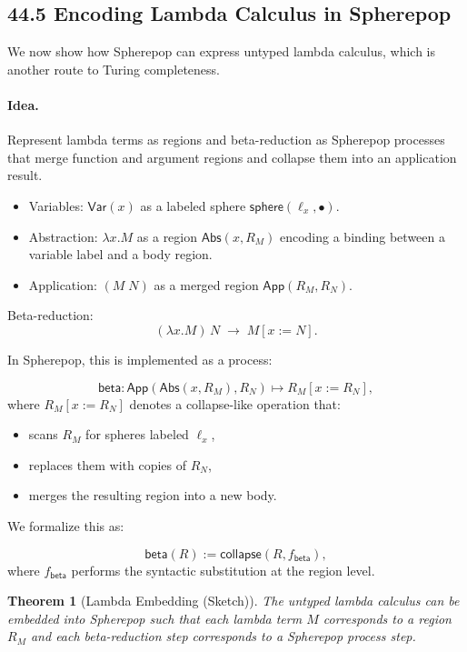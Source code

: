 \documentclass[12pt,letterpaper]{article}
\newtheorem{theorem}{Theorem}[section]
\theoremstyle{remark}
\begin{document}
\subsection{44.5 Encoding Lambda Calculus in Spherepop}

We now show how Spherepop can express untyped lambda calculus, which is another route to Turing completeness.

\paragraph{Idea.} Represent lambda terms as regions and beta-reduction as Spherepop processes that merge function and argument regions and collapse them into an application result.

\begin{itemize}
  \item Variables: $\mathsf{Var}(x)$ as a labeled sphere $\mathsf{sphere}(\ell_x, \bullet)$.
  \item Abstraction: $\lambda x. M$ as a region $\mathsf{Abs}(x, R_M)$ encoding a binding between a variable label and a body region.
  \item Application: $(M\;N)$ as a merged region $\mathsf{App}(R_M, R_N)$.
\end{itemize}

Beta-reduction:
\[
(\lambda x. M)\,N \;\to\; M[x := N].
\]

In Spherepop, this is implemented as a process:

\[
\mathsf{beta} :
\mathsf{App}(\mathsf{Abs}(x, R_M), R_N)
\mapsto
R_M[x := R_N],
\]
where $R_M[x := R_N]$ denotes a collapse-like operation that:

\begin{itemize}
  \item scans $R_M$ for spheres labeled $\ell_x$,
  \item replaces them with copies of $R_N$,
  \item merges the resulting region into a new body.
\end{itemize}

We formalize this as:

\[
\mathsf{beta}(R) := \mathsf{collapse}(R, f_{\mathsf{beta}}),
\]
where $f_{\mathsf{beta}}$ performs the syntactic substitution at the region level.

\begin{theorem}[Lambda Embedding (Sketch)]
The untyped lambda calculus can be embedded into Spherepop such that each lambda term $M$ corresponds to a region $R_M$ and each beta-reduction step corresponds to a Spherepop process step.
\end{theorem}
\end{document}
